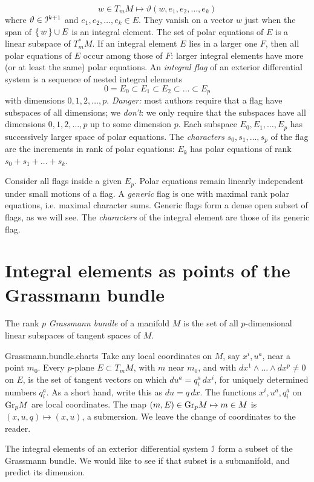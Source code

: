 \[
w \in T_m M \mapsto \vartheta(w,e_1,e_2,\dots,e_k)
\]
where \(\vartheta\in\mathcal{I}^{k+1}\) and \(e_1,e_2,\dots,e_k\in E\).
They vanish on a vector \(w\) just when the span of \(\set{w}\cup E\) is an integral element.
The set of polar equations of \(E\) is a linear subspace of \(T_m^* M\).
If an integral element \(E\) lies in a larger one \(F\), then all polar equations of \(E\) occur among those of \(F\): larger integral elements have more (or at least the same) polar equations.
An \emph{integral flag} of an exterior differential system is a sequence of nested integral elements
\[
0=E_0 \subset E_1 \subset E_2 \subset \dots \subset E_p
\]
with dimensions \(0,1,2,\dots,p\).
\emph{Danger:} most authors require that a flag have subspaces of all dimensions; we \emph{don't}: we only require that the subspaces have all dimensions \(0,1,2,\dots,p\) up to some dimension \(p\).
Each subspace \(E_0,E_1,\dots,E_p\) has successively larger space of polar equations.
The \emph{characters} \(s_0,s_1,\dots,s_p\) of the flag are the increments in rank of polar equations: \(E_k\) has polar equations of rank \(s_0+s_1+\dots+s_k\).

Consider all flags inside a given \(E_p\).
Polar equations remain linearly independent under small motions of a flag.
A \emph{generic} flag is one with maximal rank polar equations, i.e. maximal character sums.
Generic flags form a dense open subset of flags, as we will see.
The \emph{characters} of the integral element are those of its generic flag.

\section{Integral elements as points of the Grassmann bundle}
The rank \(p\) \emph{Grassmann bundle} of a manifold \(M\) is the set of all \(p\)-dimensional linear subspaces of tangent spaces of \(M\).
%
\begin{answer}{Grassmann.bundle.charts}%
Take any local coordinates on \(M\), say \(x^i,u^a\), near a point \(m_0\).
Every \(p\)-plane \(E \subset T_m M\), with \(m\) near \(m_0\), and with \(dx^1\wedge \dots \wedge dx^p \ne 0\) on \(E\), is the set of tangent vectors on which \(du^a = q^a_i \, dx^i\), for uniquely determined numbers \(q^a_i\).
As a short hand, write this as \(du=q \, dx\).
The functions \(x^i,u^a,q^a_i\) on \(\operatorname{Gr}_{p}\!M\) are local coordinates.
The map \((m,E)\in\operatorname{Gr}_{p}\!M \mapsto m\in M\) is \((x,u,q)\mapsto (x,u)\), a submersion.
We leave the change of coordinates to the reader.%
\end{answer}
The integral elements of an exterior differential system \(\mathcal{I}\) form a subset of the Grassmann bundle.
We would like to see if that subset is a submanifold, and predict its dimension.

